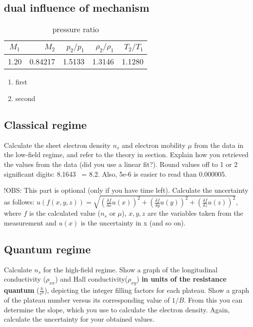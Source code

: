 \documentclass[a4paper,12pt]{article}
\begin{document}
\subsection{dual influence of mechanism}




\begin{table}
	\centering
	\caption{pressure ratio}
	\begin{tabular}{|crrrr|}
		\hline
		$M _1$& $M _2$ & $p _2 / p _1$ & $\rho _2 / \rho _1$ & $T _2 / T _1$ \\
		\hline
		1.20 & 0.84217 & 1.5133 & 1.3146 & 1.1280 \\
		\hline
	\end{tabular}
\end{table}

\begin{enumerate}
	\item first
	\item second
\end{enumerate}

\subsection{Classical regime}
Calculate the sheet electron density $n_{s}$ and electron mobility $\mu$ from the data in the low-field regime, and refer to the theory in section. Explain how you retrieved the values from the data (did you use a linear fit?).
Round values off to 1 or 2 significant digits: 8.1643 ~= 8.2. Also, 5e-6 is easier to read than 0.000005.

!OBS: This part is optional (only if you have time left).
Calculate the uncertainty as follows: \newline $u(f(x, y, z)) = \sqrt{(\frac{\delta f}{\delta{x}} u(x))^{2} + (\frac{\delta f}{\delta{y}} u(y))^{2} + (\frac{\delta f}{\delta{z}} u(z))^{2}}$, where $f$ is the calculated value ($n_{s}$ or $\mu$), $x, y, z$ are the variables taken from the measurement and $u(x)$ is the uncertainty in x (and so on).

\subsection{Quantum regime}
Calculate $n_{s}$ for the high-field regime.
Show a graph of the longitudinal conductivity ($\rho_{xx}$) and Hall conductivity($\rho_{xy}$) \textbf{in units of the resistance quantum} ($\frac{h}{e^{2}}$), depicting the integer filling factors for each plateau.
Show a graph of the plateau number versus its corresponding value of $1/B$. From this you can determine the slope, which you use to calculate the electron density.
Again, calculate the uncertainty for your obtained values.
\end{document}
